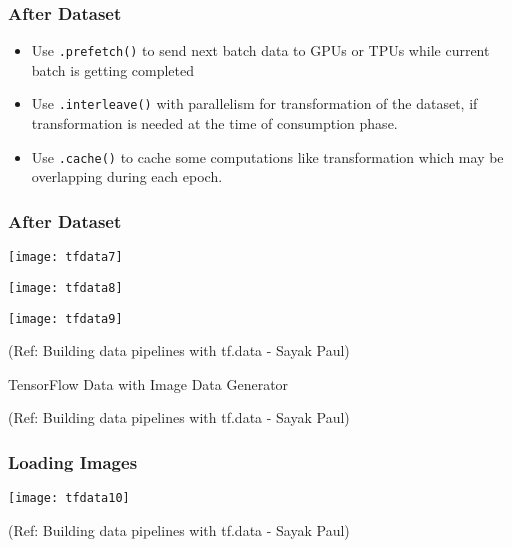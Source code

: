 \begin{frame}[fragile]\frametitle{After Dataset}
\begin{itemize}
\item Use \lstinline|.prefetch()| to send next batch data to GPUs or TPUs while current batch is getting completed
\item Use \lstinline|.interleave()| with parallelism for transformation of the dataset, if transformation is needed at the time of consumption phase. 
\item Use \lstinline|.cache()| to cache some computations like transformation which may be overlapping during each epoch.
\end{itemize}


\end{frame}

\begin{frame}[fragile]\frametitle{After Dataset}


\begin{center}
\texttt{[image: tfdata7]}

\texttt{[image: tfdata8]}


\texttt{[image: tfdata9]}

{\tiny (Ref: Building data pipelines with tf.data - Sayak Paul)}

\end{center}
\end{frame}




\begin{frame}
  \begin{center}
    {\Large TensorFlow Data with Image Data Generator}
	
{\tiny (Ref: Building data pipelines with tf.data - Sayak Paul)}

  \end{center}
\end{frame}

\begin{frame}[fragile]\frametitle{Loading Images}

\begin{center}
\texttt{[image: tfdata10]}

{\tiny (Ref: Building data pipelines with tf.data - Sayak Paul)}

\end{center}
\end{frame}

